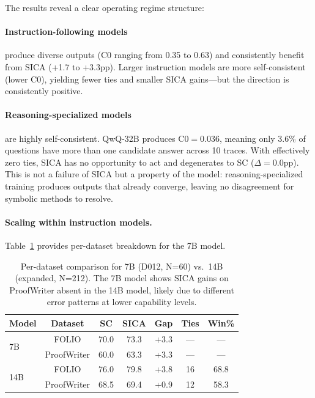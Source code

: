 \documentclass[11pt,a4paper]{article}
\begin{document}
The results reveal a clear operating regime structure:

\paragraph{Instruction-following models} produce diverse outputs (C0 ranging from 0.35 to 0.63) and consistently benefit from SICA (+1.7 to +3.3pp). Larger instruction models are more self-consistent (lower C0), yielding fewer ties and smaller SICA gains---but the direction is consistently positive.

\paragraph{Reasoning-specialized models} are highly self-consistent. QwQ-32B produces C0$=$0.036, meaning only 3.6\% of questions have more than one candidate answer across 10 traces. With effectively zero ties, SICA has no opportunity to act and degenerates to SC ($\Delta{=}$0.0pp). This is not a failure of SICA but a property of the model: reasoning-specialized training produces outputs that already converge, leaving no disagreement for symbolic methods to resolve.

\paragraph{Scaling within instruction models.} Table~\ref{tab:7b_detail} provides per-dataset breakdown for the 7B model.

\begin{table}[t]
\centering
\small
\begin{tabular}{lcccccc}
\toprule
\textbf{Model} & \textbf{Dataset} & \textbf{SC} & \textbf{SICA} & \textbf{Gap} & \textbf{Ties} & \textbf{Win\%} \\
\midrule
\multirow{2}{*}{7B} & FOLIO & 70.0 & 73.3 & +3.3 & --- & --- \\
 & ProofWriter & 60.0 & 63.3 & +3.3 & --- & --- \\
\midrule
\multirow{2}{*}{14B} & FOLIO & 76.0 & 79.8 & +3.8 & 16 & 68.8 \\
 & ProofWriter & 68.5 & 69.4 & +0.9 & 12 & 58.3 \\
\bottomrule
\end{tabular}
\caption{Per-dataset comparison for 7B (D012, N=60) vs.\ 14B (expanded, N=212). The 7B model shows SICA gains on ProofWriter absent in the 14B model, likely due to different error patterns at lower capability levels.}
\label{tab:7b_detail}
\end{table}
\end{document}
